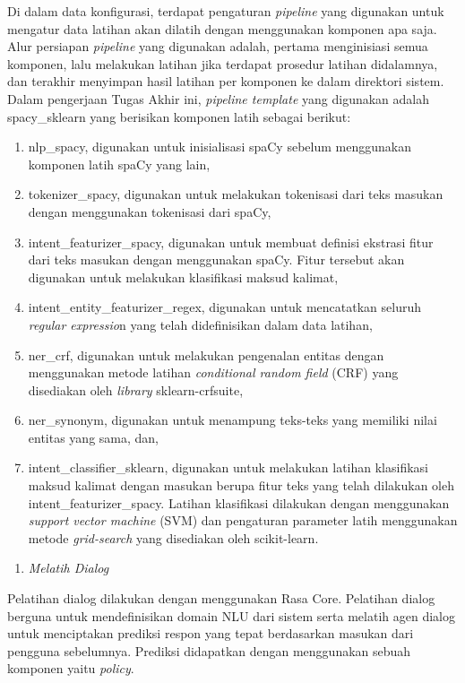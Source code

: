 Di dalam data konfigurasi, terdapat pengaturan \textit{pipeline} yang digunakan untuk mengatur data latihan akan dilatih dengan menggunakan komponen apa saja. Alur persiapan \textit{pipeline} yang digunakan adalah, pertama menginisiasi semua komponen, lalu melakukan latihan jika terdapat prosedur latihan didalamnya, dan terakhir menyimpan hasil latihan per komponen ke dalam direktori sistem. Dalam pengerjaan Tugas Akhir ini, \textit{pipeline template} yang digunakan adalah spacy\_sklearn yang berisikan komponen latih sebagai berikut:

\begin{enumerate}
	\item nlp\_spacy, digunakan untuk inisialisasi spaCy sebelum menggunakan komponen latih spaCy yang lain,
	\item tokenizer\_spacy, digunakan untuk melakukan tokenisasi dari teks masukan dengan menggunakan tokenisasi dari spaCy,
	\item intent\_featurizer\_spacy, digunakan untuk membuat definisi ekstrasi fitur dari teks masukan dengan menggunakan spaCy. Fitur tersebut akan digunakan untuk melakukan klasifikasi maksud kalimat,
	\item intent\_entity\_featurizer\_regex, digunakan untuk mencatatkan seluruh \textit{regular expressio}n yang telah didefinisikan dalam data latihan,
	\item ner\_crf, digunakan untuk melakukan pengenalan entitas dengan menggunakan metode latihan \textit{conditional random field} (CRF) yang disediakan oleh \textit{library} sklearn-crfsuite,
	\item ner\_synonym, digunakan untuk menampung teks-teks yang memiliki nilai entitas yang sama, dan,
	\item intent\_classifier\_sklearn, digunakan untuk melakukan latihan klasifikasi maksud kalimat dengan masukan berupa fitur teks yang telah dilakukan oleh intent\_featurizer\_spacy. Latihan klasifikasi dilakukan dengan menggunakan \textit{support vector machine} (SVM) dan pengaturan parameter latih menggunakan metode \textit{grid-search} yang disediakan oleh scikit-learn.
\end{enumerate}

\begin{enumerate}[resume*=rasa_process_list]
	\item \textit{Melatih Dialog}
\end{enumerate}

Pelatihan dialog dilakukan dengan menggunakan Rasa Core. Pelatihan dialog berguna untuk mendefinisikan domain NLU dari sistem serta melatih agen dialog untuk menciptakan prediksi respon yang tepat berdasarkan masukan dari pengguna sebelumnya. Prediksi didapatkan dengan menggunakan sebuah komponen yaitu \textit{policy}.

